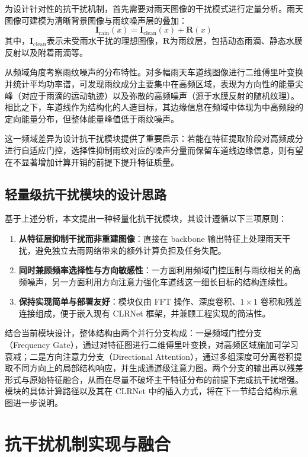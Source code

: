 为设计针对性的抗干扰机制，首先需要对雨天图像的干扰模式进行定量分析。雨天图像可建模为清晰背景图像与雨纹噪声层的叠加\cite{zhang2018}：
\begin{equation}
	\mathbf{I}_{\text{rain}}(x) = \mathbf{I}_{\text{clean}}(x) + \mathbf{R}(x)
\end{equation}
其中，$\mathbf{I}_{\text{clean}}$表示未受雨水干扰的理想图像，$\mathbf{R}$为雨纹层，包括动态雨滴、静态水膜反射以及附着雨滴等。

从频域角度考察雨纹噪声的分布特性。对多幅雨天车道线图像进行二维傅里叶变换并统计平均功率谱，可发现雨纹成分主要集中在高频区域，表现为方向性的能量尖峰（对应于雨滴的运动轨迹）以及弥散的高频噪声（源于水膜反射的随机纹理）。相比之下，车道线作为结构化的人造目标，其边缘信息在频域中体现为中高频段的定向能量分布，但整体能量峰值低于雨纹噪声。

这一频域差异为设计抗干扰模块提供了重要启示：若能在特征提取阶段对高频成分进行自适应门控，选择性抑制雨纹对应的噪声分量而保留车道线边缘信息，则有望在不显著增加计算开销的前提下提升特征质量。

\subsection{轻量级抗干扰模块的设计思路}

基于上述分析，本文提出一种轻量化抗干扰模块，其设计遵循以下三项原则：
\begin{enumerate}
	\item \textbf{从特征层抑制干扰而非重建图像}：直接在 backbone 输出特征上处理雨天干扰，避免独立去雨网络带来的额外计算负担及任务失配。
	\item \textbf{同时兼顾频率选择性与方向敏感性}：一方面利用频域门控压制与雨纹相关的高频噪声，另一方面利用方向注意力强化车道线这一细长目标的结构连续性。
	\item \textbf{保持实现简单与部署友好}：模块仅由 FFT 操作、深度卷积、$1\times1$ 卷积和残差连接组成，便于嵌入现有 CLRNet 框架，并兼顾工程实现的简洁性。
\end{enumerate}

结合当前模块设计，整体结构由两个并行分支构成：一是频域门控分支（Frequency Gate），通过对特征图进行二维傅里叶变换，对高频区域施加可学习衰减；二是方向注意力分支（Directional Attention），通过多组深度可分离卷积提取不同方向上的局部结构响应，并生成通道级注意力图。两个分支的输出再以残差形式与原始特征融合，从而在尽量不破坏主干特征分布的前提下完成抗干扰增强。模块的具体计算路径以及其在 CLRNet 中的插入方式，将在下一节结合结构示意图进一步说明。

\section{抗干扰机制实现与融合}
\label{sec:anti_interference}

